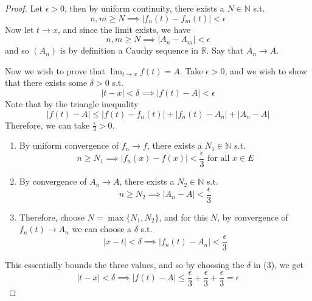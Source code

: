   \begin{proof}
    Let $\epsilon > 0$, then by uniform continuity, there exists a $N \in \mathbb{N}$ s.t. 
    \begin{equation}
      n, m \geq N \implies |f_n (t) - f_m (t)| < \epsilon
    \end{equation}
    Now let $t \to x$, and since the limit exists, we have 
    \begin{equation}
      n, m \geq N \implies |A_n - A_m| < \epsilon
    \end{equation} 
    and so $(A_n)$ is by definition a Cauchy sequence in $\mathbb{R}$. Say that $A_n \to A$. 

    Now we wish to prove that $\lim_{t \to x} f(t) = A$. Take $\epsilon > 0$, and we wish to show that there exists some $\delta > 0$ s.t. 
    \begin{equation}
      |t - x| < \delta \implies |f(t) - A| < \epsilon
    \end{equation}
    Note that by the triangle inequality
    \begin{equation}
      |f(t) - A| \leq |f(t) - f_n (t)| + |f_n (t) - A_n| + |A_n - A|
    \end{equation}
    Therefore, we can take $\frac{\epsilon}{3} > 0$. 
    \begin{enumerate}
      \item By uniform convergence of $f_n \to f$, there exists a $N_1 \in \mathbb{N}$ s.t. 
      \begin{equation}
        n \geq N_1 \implies |f_n (x) - f(x)| < \frac{\epsilon}{3} \text{ for all } x \in E
      \end{equation}

      \item By convergence of $A_n \to A$, there exists a $N_2 \in \mathbb{N}$ s.t. 
      \begin{equation}
        n \geq N_2 \implies |A_n - A| < \frac{\epsilon}{3} 
      \end{equation}

      \item Therefore, choose $N = \max\{N_1, N_2\}$, and for this $N$, by convergence of $f_n (t) \to A_n$ we can choose a $\delta$ s.t. 
        \begin{equation}
          |x - t| < \delta \implies |f_n (t) - A_n| < \frac{\epsilon}{3} 
        \end{equation}
    \end{enumerate}
    This essentially bounds the three values, and so by choosing the $\delta$ in (3), we get 
    \begin{equation}
      |t - x| < \delta \implies |f(t) - A| \leq \frac{\epsilon}{3} + \frac{\epsilon}{3} + \frac{\epsilon}{3} = \epsilon
    \end{equation}
  \end{proof}

